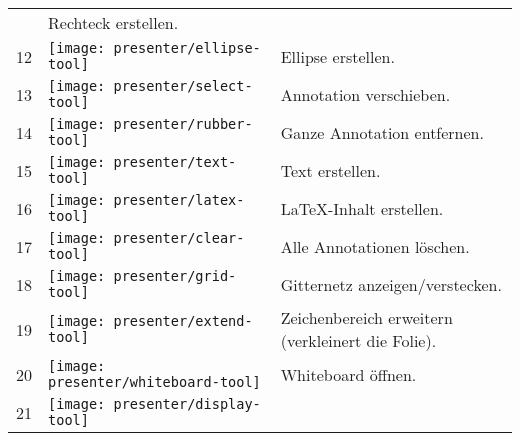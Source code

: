 \begin{longtable}{lp{1cm}p{12cm}}
	& Rechteck erstellen. \\
	12 &
	\begin{minipage}{.06\textwidth}
		\texttt{[image: presenter/ellipse-tool]}
	\end{minipage}
	& Ellipse erstellen. \\
	13 &
	\begin{minipage}{.06\textwidth}
		\texttt{[image: presenter/select-tool]}
	\end{minipage}
	& Annotation verschieben. \\
	14 &
	\begin{minipage}{.06\textwidth}
		\texttt{[image: presenter/rubber-tool]}
	\end{minipage}
	& Ganze Annotation entfernen. \\
	15 &
	\begin{minipage}{.06\textwidth}
		\texttt{[image: presenter/text-tool]}
	\end{minipage}
	& Text erstellen. \\
	16 &
	\begin{minipage}{.06\textwidth}
		\texttt{[image: presenter/latex-tool]}
	\end{minipage}
	& LaTeX-Inhalt erstellen. \\
	17 &
	\begin{minipage}{.06\textwidth}
		\texttt{[image: presenter/clear-tool]}
	\end{minipage}
	& Alle Annotationen löschen. \\
	18 &
	\begin{minipage}{.06\textwidth}
		\texttt{[image: presenter/grid-tool]}
	\end{minipage}
	& Gitternetz anzeigen/verstecken. \\
	19 &
	\begin{minipage}{.06\textwidth}
		\texttt{[image: presenter/extend-tool]}
	\end{minipage}
	& Zeichenbereich erweitern (verkleinert die Folie). \\
	20 &
	\begin{minipage}{.06\textwidth}
		\texttt{[image: presenter/whiteboard-tool]}
	\end{minipage}
	& Whiteboard öffnen. \\
	21 &
	\begin{minipage}{.06\textwidth}
		\texttt{[image: presenter/display-tool]}

\end{minipage}
\end{longtable}
